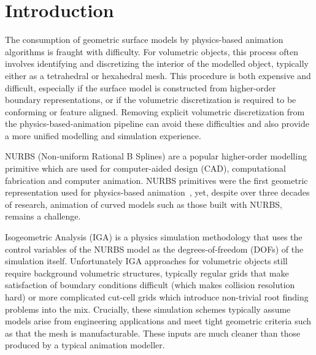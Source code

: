 \section{Introduction}

The consumption of geometric surface models by physics-based animation algorithms is fraught with difficulty. 
For volumetric objects, this process often involves identifying and discretizing the interior of the modelled object, 
typically either as a tetrahedral or hexahedral mesh. 
This procedure is both expensive and difficult, especially if the surface model is constructed from higher-order boundary
representations, or if the volumetric discretization is required to be conforming or feature aligned. 
Removing explicit volumetric discretization from the physics-based-animation pipeline can avoid these difficulties and 
also provide a more unified modelling and simulation experience. 

NURBS (Non-uniform Rational B Splines) are a popular higher-order modelling primitive which 
are used for computer-aided design (CAD), computational fabrication and computer animation. 
NURBS primitives were the first geometric representation used for physics-based animation~\cite{10.1145/37402.37427}, yet,
despite over three decades of research, animation of curved models such as those built with NURBS, remains a challenge.

Isogeometric Analysis (IGA) is a physics simulation methodology that uses the control variables of the NURBS model
as the degrees-of-freedom (DOFs) of the simulation itself. 
Unfortunately IGA approaches for volumetric objects still require background volumetric structures, typically
regular grids that make satisfaction of boundary conditions difficult (which makes collision resolution hard)
or more complicated cut-cell grids which introduce non-trivial root finding problems into the mix. 
Crucially, these simulation schemes typically assume models arise from engineering applications and meet tight geometric
criteria such as that the mesh is manufacturable. 
These inputs are much cleaner than those produced by a typical animation modeller. 



